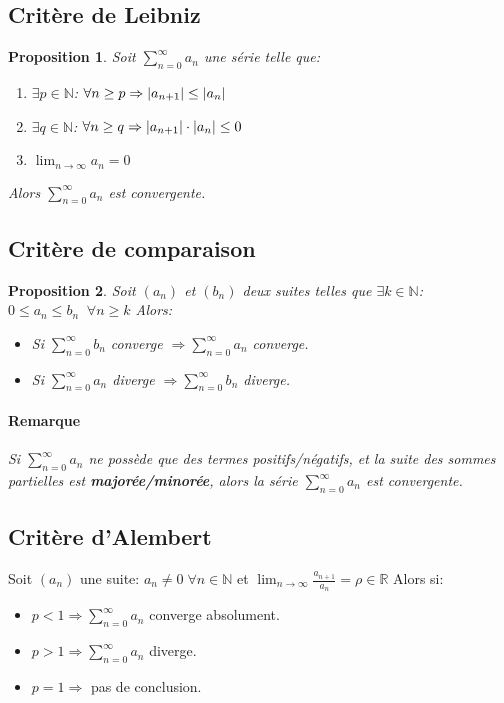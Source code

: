 \documentclass[10pt,a4paper]{book}
\newcommand{\R}{\mathbb{R}}
\newcommand{\N}{\mathbb{N}}
\DeclarePairedDelimiter\abs{\lvert}{\rvert}
\newtheorem{proposition}{Proposition}[section]
\begin{document}
\subsection{Critère de Leibniz}

\begin{proposition}
Soit $\sum^{\infty}_{n=0}a_n$ une série telle que:
\begin{enumerate}
\item $\exists p\in \N$: $\forall n\geq p \Rightarrow \abs{a_{n+1}} \leq \abs{a_n}$
\item $\exists q\in \N$: $\forall n\geq q \Rightarrow \abs{a_{n+1}}\cdot \abs{a_n} \leq 0$
\item $\lim_{n\rightarrow \infty}a_n = 0$
\end{enumerate}
Alors $\sum^{\infty}_{n=0}a_n$ est convergente.
\end{proposition}

\subsection{Critère de comparaison}

\begin{proposition}
Soit $(a_n)$ et $(b_n)$ deux suites telles que $\exists k\in \N$: $0\leq a_n \leq b_n\; \; \forall n\geq k$
Alors:
\begin{itemize}
\item Si $\sum^{\infty}_{n=0} b_n$ converge $\Longrightarrow \sum^{\infty}_{n=0} a_n$ converge.
\item Si $\sum^{\infty}_{n=0} a_n$ diverge $\Longrightarrow \sum^{\infty}_{n=0} b_n$ diverge.
\end{itemize}
\paragraph{Remarque} Si $\sum^{\infty}_{n=0} a_n$ ne possède que des termes positifs/négatifs, et la suite des sommes partielles est \textbf{majorée/minorée}, alors la série $\sum^{\infty}_{n=0} a_n$ est convergente.
\end{proposition}

\subsection{Critère d'Alembert}

Soit $(a_n)$ une suite: $a_n \neq 0\; \forall n\in \N$ et $\lim_{n\rightarrow \infty}\frac{a_{n+1}}{a_n} = \rho \in \R$
Alors si:
\begin{itemize}
\item $p<1 \Longrightarrow \sum^{\infty}_{n=0}a_n$ converge absolument.
\item $p>1 \Longrightarrow \sum^{\infty}_{n=0}a_n$ diverge.
\item $p=1 \Longrightarrow$ pas de conclusion.
\end{itemize}
\end{document}
